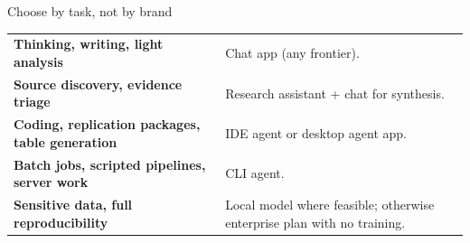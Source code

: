 \begin{frame}{Choose by task, not by brand}
  \vspace{0.2cm}
  \begin{center}
  \begin{tabularx}{0.92\linewidth}{>{\bfseries\color{deepblue}}lX}
  \toprule
  Thinking, writing, light analysis & Chat app (any frontier).\\
  Source discovery, evidence triage & Research assistant + chat for synthesis.\\
  Coding, replication packages, table generation & IDE agent or desktop agent app.\\
  Batch jobs, scripted pipelines, server work & CLI agent.\\
  Sensitive data, full reproducibility & Local model where feasible; otherwise enterprise plan with no training.\\
  \bottomrule
  \end{tabularx}
  \end{center}
  \vspace{0.5cm}
\end{frame}
